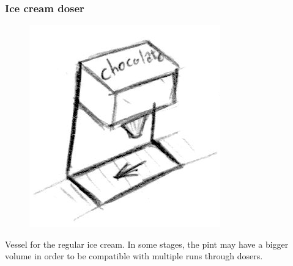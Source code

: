 \documentclass[a4paper]{scrartcl}
\begin{document}
        \subsubsection{Ice cream doser}
            \begin{minipage}[t][6em][t]{\textwidth}
                \begin{figure}
                    \vspace{-20pt}
                    \includegraphics[scale=1]{devices/ice_cream_doser}
                    \vspace{-20pt}
                \end{figure}

                Vessel for the regular ice cream. In some stages, the pint may have
                a bigger volume in order to be compatible with multiple runs through
                dosers.
            \end{minipage}
\end{document}
